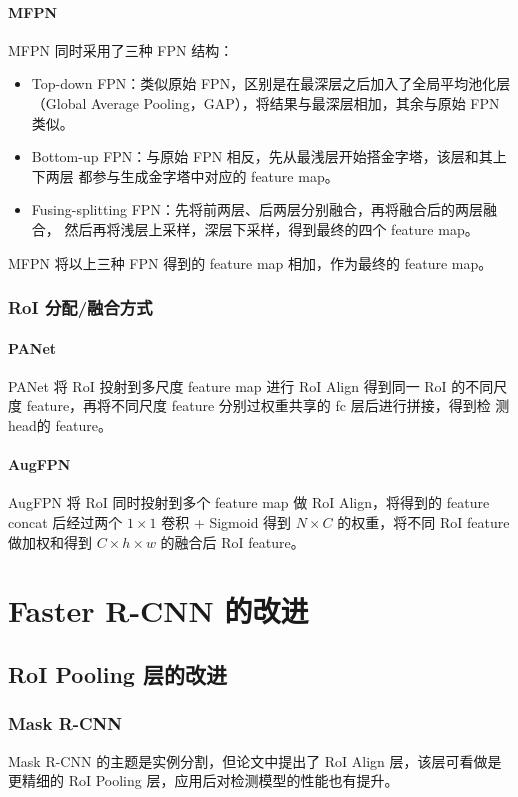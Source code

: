 \paragraph{MFPN}
MFPN 同时采用了三种 FPN 结构：

\begin{itemize}
  \item Top-down FPN：类似原始 FPN，区别是在最深层之后加入了全局平均池化层
    （Global Average Pooling，GAP），将结果与最深层相加，其余与原始 FPN 类似。
  \item Bottom-up FPN：与原始 FPN 相反，先从最浅层开始搭金字塔，该层和其上下两层
    都参与生成金字塔中对应的 feature map。
  \item Fusing-splitting FPN：先将前两层、后两层分别融合，再将融合后的两层融合，
    然后再将浅层上采样，深层下采样，得到最终的四个 feature map。
\end{itemize}

MFPN 将以上三种 FPN 得到的 feature map 相加，作为最终的 feature map。

\subsubsection{RoI 分配/融合方式}
\paragraph{PANet}
PANet 将 RoI 投射到多尺度 feature map 进行 RoI Align 得到同一 RoI 的不同尺
度 feature，再将不同尺度 feature 分别过权重共享的 fc 层后进行拼接，得到检
测 head的 feature\cite{2018-PANet}。

\paragraph{AugFPN}
AugFPN 将 RoI 同时投射到多个 feature map 做 RoI Align，将得到的 feature concat
后经过两个 $1 \times 1$ 卷积 + Sigmoid 得到 $N \times C$ 的权重，将不同 RoI
feature 做加权和得到 $C \times h \times w$ 的融合后 RoI feature\cite{2019-AugFPN}。

\section{Faster R-CNN 的改进}\label{sec:faster-improve}

\subsection{RoI Pooling 层的改进}
\subsubsection{Mask R-CNN}
Mask R-CNN 的主题是实例分割，但论文中提出了 RoI Align 层，该层可看做是更精细的 RoI
Pooling 层，应用后对检测模型的性能也有提升。

